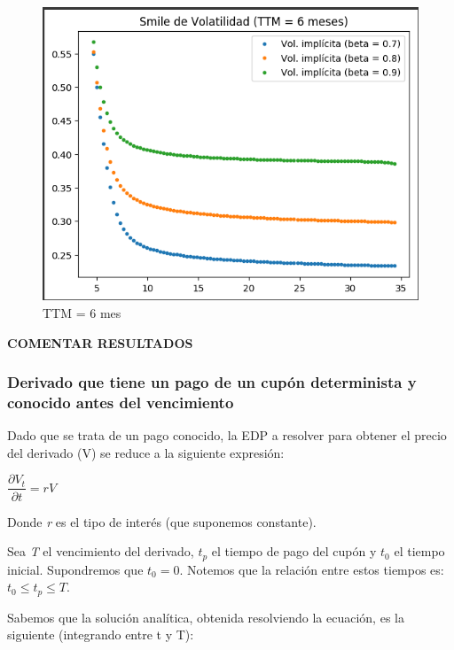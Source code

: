 \documentclass[titlepage, 10pt,]{article}
\begin{document}
{\begin{figure}[!]
	\centering
	\includegraphics[scale=0.65]{TTM6}
	\caption{TTM = 6 mes}
\end{figure}



\textbf{COMENTAR RESULTADOS}



\newpage
\subsubsection*{Derivado que tiene un pago de un cupón determinista y conocido antes del vencimiento}

Dado que se trata de un pago conocido, la EDP a resolver para obtener el precio del derivado (V) se reduce a la siguiente expresión:

\begin{center}
	$\dfrac{\partial V_{t}}{\partial t} = rV$
\end{center}

Donde \textit{r} es el tipo de interés (que suponemos constante).

\vspace{5pt}
Sea \textit{T} el vencimiento del derivado, $t_{p}$ el tiempo de pago del cupón y $t_{0}$ el tiempo inicial. Supondremos que $t_{0}=0$. Notemos que la relación entre estos tiempos es: $t_{0} \leq t_{p} \leq T$.  

\vspace{5pt}
Sabemos que la solución analítica, obtenida resolviendo la ecuación, es la siguiente (integrando entre t y T):

}
\end{document}
